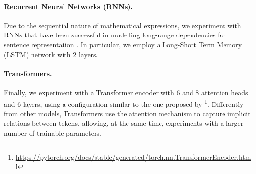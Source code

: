 \documentclass[11pt]{article}
\begin{document}
\paragraph{Recurrent Neural Networks (RNNs).} Due to the sequential nature of mathematical expressions, we experiment with RNNs that have been successful in modelling long-range dependencies for sentence representation \cite{yu2019review,hochreiter1996lstm}. In particular, we employ a Long-Short Term Memory (LSTM) network with 2 layers.

\paragraph{Transformers.} Finally, we experiment with a Transformer encoder with 6 and 8 attention heads and 6 layers, using a configuration similar to the one proposed by \citet{vaswani2017attention}\footnote{\url{https://pytorch.org/docs/stable/generated/torch.nn.TransformerEncoder.html}}. Differently from other models, Transformers use the attention mechanism to capture implicit relations between tokens, allowing, at the same time, experiments with a larger number of trainable parameters.

\end{document}
